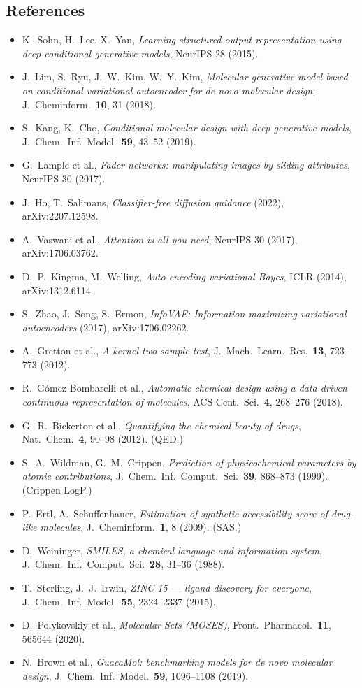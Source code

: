 \documentclass[11pt]{article}
\begin{document}
\subsection*{References}
{\small\sloppy
\begin{itemize}[nosep, leftmargin=1.2em]
  \item K.~Sohn, H.~Lee, X.~Yan, \textit{Learning structured output representation using deep conditional generative models}, NeurIPS 28 (2015).
  \item J.~Lim, S.~Ryu, J.~W.~Kim, W.~Y.~Kim, \textit{Molecular generative model based on conditional variational autoencoder for de novo molecular design}, J.\ Cheminform.\ \textbf{10}, 31 (2018).
  \item S.~Kang, K.~Cho, \textit{Conditional molecular design with deep generative models}, J.\ Chem.\ Inf.\ Model.\ \textbf{59}, 43--52 (2019).
  \item G.~Lample et al., \textit{Fader networks: manipulating images by sliding attributes}, NeurIPS 30 (2017).
  \item J.~Ho, T.~Salimans, \textit{Classifier-free diffusion guidance} (2022), arXiv:2207.12598.
  \item A.~Vaswani et al., \textit{Attention is all you need}, NeurIPS 30 (2017), arXiv:1706.03762.
  \item D.~P.~Kingma, M.~Welling, \textit{Auto-encoding variational Bayes}, ICLR (2014), arXiv:1312.6114.
  \item S.~Zhao, J.~Song, S.~Ermon, \textit{InfoVAE: Information maximizing variational autoencoders} (2017), arXiv:1706.02262.
  \item A.~Gretton et al., \textit{A kernel two-sample test}, J.\ Mach.\ Learn.\ Res.\ \textbf{13}, 723--773 (2012).
  \item R.~G\'omez-Bombarelli et al., \textit{Automatic chemical design using a data-driven continuous representation of molecules}, ACS Cent.\ Sci.\ \textbf{4}, 268--276 (2018).
  \item G.~R.~Bickerton et al., \textit{Quantifying the chemical beauty of drugs}, Nat.\ Chem.\ \textbf{4}, 90--98 (2012). (QED.)
  \item S.~A.~Wildman, G.~M.~Crippen, \textit{Prediction of physicochemical parameters by atomic contributions}, J.\ Chem.\ Inf.\ Comput.\ Sci.\ \textbf{39}, 868--873 (1999). (Crippen LogP.)
  \item P.~Ertl, A.~Schuffenhauer, \textit{Estimation of synthetic accessibility score of drug-like molecules}, J.\ Cheminform.\ \textbf{1}, 8 (2009). (SAS.)
  \item D.~Weininger, \textit{SMILES, a chemical language and information system}, J.\ Chem.\ Inf.\ Comput.\ Sci.\ \textbf{28}, 31--36 (1988).
  \item T.~Sterling, J.~J.~Irwin, \textit{ZINC 15 --- ligand discovery for everyone}, J.\ Chem.\ Inf.\ Model.\ \textbf{55}, 2324--2337 (2015).
  \item D.~Polykovskiy et al., \textit{Molecular Sets (MOSES)}, Front.\ Pharmacol.\ \textbf{11}, 565644 (2020).
  \item N.~Brown et al., \textit{GuacaMol: benchmarking models for de novo molecular design}, J.\ Chem.\ Inf.\ Model.\ \textbf{59}, 1096--1108 (2019).
\end{itemize}}
\end{document}
